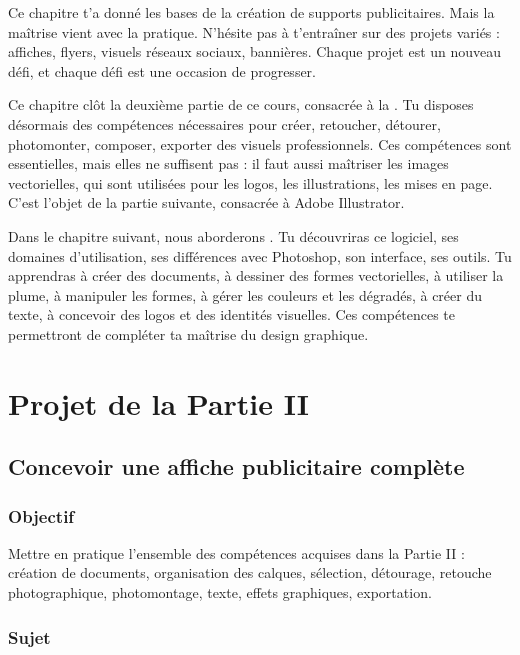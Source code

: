 Ce chapitre t'a donné les bases de la création de supports publicitaires. Mais la maîtrise vient avec la pratique. N'hésite pas à t'entraîner sur des projets variés : affiches, flyers, visuels réseaux sociaux, bannières. Chaque projet est un nouveau défi, et chaque défi est une occasion de progresser.

Ce chapitre clôt la deuxième partie de ce cours, consacrée à la . Tu disposes désormais des compétences nécessaires pour créer, retoucher, détourer, photomonter, composer, exporter des visuels professionnels. Ces compétences sont essentielles, mais elles ne suffisent pas : il faut aussi maîtriser les images vectorielles, qui sont utilisées pour les logos, les illustrations, les mises en page. C'est l'objet de la partie suivante, consacrée à Adobe Illustrator.

Dans le chapitre suivant, nous aborderons . Tu découvriras ce logiciel, ses domaines d'utilisation, ses différences avec Photoshop, son interface, ses outils. Tu apprendras à créer des documents, à dessiner des formes vectorielles, à utiliser la plume, à manipuler les formes, à gérer les couleurs et les dégradés, à créer du texte, à concevoir des logos et des identités visuelles. Ces compétences te permettront de compléter ta maîtrise du design graphique.

\section*{Projet de la Partie II}

\subsection*{Concevoir une affiche publicitaire complète}

\subsubsection*{Objectif}

Mettre en pratique l'ensemble des compétences acquises dans la Partie II : création de documents, organisation des calques, sélection, détourage, retouche photographique, photomontage, texte, effets graphiques, exportation.

\subsubsection*{Sujet}

